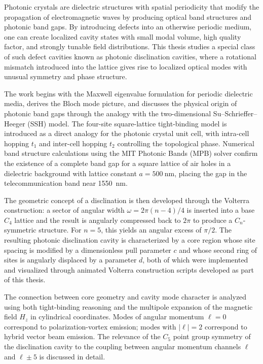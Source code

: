 \documentclass[12pt,a4paper,oneside]{book}
\theoremstyle{plain}
\theoremstyle{definition}
\theoremstyle{remark}
\begin{document}
Photonic crystals are dielectric structures with spatial periodicity that modify the propagation of electromagnetic waves by producing optical band structures and photonic band gaps. By introducing defects into an otherwise periodic medium, one can create localized cavity states with small modal volume, high quality factor, and strongly tunable field distributions. This thesis studies a special class of such defect cavities known as photonic disclination cavities, where a rotational mismatch introduced into the lattice gives rise to localized optical modes with unusual symmetry and phase structure.

The work begins with the Maxwell eigenvalue formulation for periodic dielectric media, derives the Bloch mode picture, and discusses the physical origin of photonic band gaps through the analogy with the two-dimensional Su--Schrieffer--Heeger (SSH) model. The four-site square-lattice tight-binding model is introduced as a direct analogy for the photonic crystal unit cell, with intra-cell hopping $t_1$ and inter-cell hopping $t_2$ controlling the topological phase. Numerical band structure calculations using the MIT Photonic Bands (MPB) solver confirm the existence of a complete band gap for a square lattice of air holes in a dielectric background with lattice constant $a = \SI{500}{\nano\metre}$, placing the gap in the telecommunication band near \SI{1550}{\nano\metre}.

The geometric concept of a disclination is then developed through the Volterra construction: a sector of angular width $\omega = 2\pi(n-4)/4$ is inserted into a base $C_4$ lattice and the result is angularly compressed back to $2\pi$ to produce a $C_n$-symmetric structure. For $n = 5$, this yields an angular excess of $\pi/2$. The resulting photonic disclination cavity is characterized by a core region whose site spacing is modified by a dimensionless pull parameter $c$ and whose second ring of sites is angularly displaced by a parameter $d$, both of which were implemented and visualized through animated Volterra construction scripts developed as part of this thesis.

The connection between core geometry and cavity mode character is analyzed using both tight-binding reasoning and the multipole expansion of the magnetic field $H_z$ in cylindrical coordinates. Modes of angular momentum $\ell = 0$ correspond to polarization-vortex emission; modes with $|\ell| = 2$ correspond to hybrid vector beam emission. The relevance of the $C_5$ point group symmetry of the disclination cavity to the coupling between angular momentum channels $\ell$ and $\ell \pm 5$ is discussed in detail.
\end{document}
